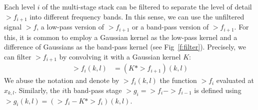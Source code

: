 Each level $i$ of the multi-stage stack can be filtered to separate the level of detail $\gt{f}_{i+1}$ into different frequency bands. In this sense, we can use the unfiltered signal $\gt{f}$, a low-pass version of $\gt{f}_{i+1}$ or a band-pass version of $\gt{f}_{i+1}$. For this, it is common to employ a Gaussian kernel as the low-pass kernel and a difference of Gaussians as the band-pass kernel (see Fig~\ref{f:filter}).
Precisely, we can filter $\gt{f}_{i+1}$ by convolving it with a Gaussian kernel $K$:
\begin{align}\label{e-gaussian-filter}
    \gt{f}_i(k,l)&=\left(K*\gt{f}_{i+1}\right)(k,l)
\end{align}
We abuse the notation and denote by $\gt{f}_i(k,l)$ the function $\gt{f}_i$ evaluated at  $x_{k,l}$.
Similarly, the $i$th band-pass stage $\gt{g}_i=\gt{f}_i-\gt{f}_{i-1}$ is defined using $\gt{g}_i(k,l)=\left(\gt{f}_{i}-K*\gt{f}_{i}\right)(k,l)$.

